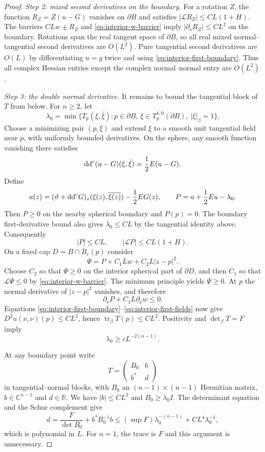 \begin{proof}
\emph{Step 2: mixed second derivatives on the boundary.} For a rotation $Z$, the function $R_Z=Z(u-G)$ vanishes on $\partial B$ and satisfies $|\mathcal LR_Z|\leq CL(1+H)$. The barriers $CLw\pm R_Z$ and \eqref{eq:interior-w-barrier} imply $|\partial_\nu R_Z|\leq CL^2$ on the boundary. Rotations span the real tangent space of $\partial B$, so all real mixed normal--tangential second derivatives are $O(L^2)$. Pure tangential second derivatives are $O(L)$ by differentiating $u=g$ twice and using \eqref{eq:interior-first-boundary}. Thus all complex Hessian entries except the complex normal--normal entry are $O(L^2)$.

\emph{Step 3: the double normal derivative.} It remains to bound the tangential block of $T$ from below. For $n\geq2$, let
\[
  \lambda_0=\min\{T_p(\xi,\bar\xi):p\in\partial B,
  \ \xi\in T_p^{1,0}(\partial B),\ |\xi|_\beta=1\}.
\]
Choose a minimizing pair $(p,\xi)$ and extend $\xi$ to a smooth unit tangential field near $p$, with uniformly bounded derivatives. On the sphere, any smooth function vanishing there satisfies
\[
  \mathrm{dd}^{\mathrm{c}}(u-G)(\xi,\bar\xi)=\frac12E(u-G).
\]
Define
\[
  a(z)=(\vartheta+\mathrm{dd}^{\mathrm{c}} G)_z(\xi(z),\overline{\xi(z)})-\frac12EG(z),
  \qquad
  P=a+\frac12Eu-\lambda_0.
\]
Then $P\geq0$ on the nearby spherical boundary and $P(p)=0$.
The boundary first-derivative bound also gives $\lambda_0\leq CL$ by
the tangential identity above. Consequently
\[
  |P|\leq CL,
  \qquad
  |\mathcal LP|\leq CL(1+H).
\]
On a fixed cap $D=B\cap B_r(p)$ consider
\[
  \Psi=P+C_1Lw+C_2L|z-p|^2.
\]
Choose $C_2$ so that $\Psi\geq0$ on the interior spherical part of $\partial D$, and then $C_1$ so that $\mathcal L\Psi\leq0$ by \eqref{eq:interior-w-barrier}. The minimum principle yields $\Psi\geq0$. At $p$ the normal derivative of $|z-p|^2$ vanishes, and therefore
\[
  \partial_\nu P+C_1L\partial_\nu w\leq0.
\]
Equations \eqref{eq:interior-first-boundary}--\eqref{eq:interior-first-fields} now give $D^2u(\nu,\nu)(p)\leq CL^2$, hence $\operatorname{tr}_\beta T(p)\leq CL^2$. Positivity and $\det_\beta T=F$ imply
\begin{equation}\label{eq:interior-tangential-lower}
  \lambda_0\geq cL^{-2(n-1)}.
\end{equation}

At any boundary point write
\[
  T=\begin{pmatrix}B_0&b\\ b^*&d\end{pmatrix}
\]
in tangential--normal blocks, with $B_0$ an $(n-1)\times(n-1)$ Hermitian matrix, $b\in\mathbb C^{n-1}$ and $d\in\mathbb R$. We have $|b|\leq CL^2$ and $B_0\geq\lambda_0I$. The determinant equation and the Schur complement give
\[
  d=\frac{F}{\det B_0}+b^*B_0^{-1}b
  \leq(\sup F)\lambda_0^{-(n-1)}+CL^4\lambda_0^{-1},
\]
which is polynomial in $L$. For $n=1$, the trace is $F$ and this argument is unnecessary.


\end{proof}
